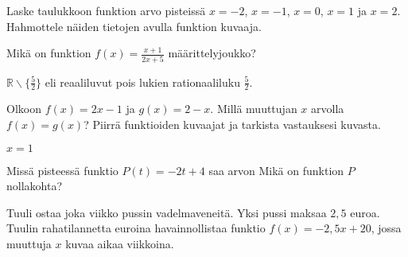 \begin{tehtavasivu}
\begin{tehtava}
  Laske taulukkoon funktion arvo pisteissä $x=-2$, $x=-1$, $x=0$, $x=1$ ja $x=2$. Hahmottele näiden tietojen avulla funktion kuvaaja.

  \begin{vastaus}
  \end{vastaus}
\end{tehtava}

\begin{tehtava} %
  Mikä on funktion $f(x)=\frac{x+1}{2x+5}$ määrittelyjoukko?

  \begin{vastaus}
   $\mathbb{R} \backslash \lbrace \frac{5}{2} \rbrace$ eli reaaliluvut pois lukien rationaaliluku $\frac{5}{2}$.
  \end{vastaus}

\end{tehtava}

\begin{tehtava} %
	Olkoon $f(x) = 2x-1$ ja $g(x) = 2-x$. Millä muuttujan $x$ arvolla $f(x) = g(x)$? Piirrä funktioiden kuvaajat ja tarkista vastauksesi kuvasta.
    \begin{vastaus}
    $x=1$
    \end{vastaus}
\end{tehtava}

\begin{tehtava} %
	Missä pisteessä funktio $P(t)=-2t+4$ saa arvon
	 Mikä on funktion $P$ nollakohta?
	 \begin{vastaus}
	 \end{vastaus}
\end{tehtava}

\begin{tehtava} %
	Tuuli ostaa joka viikko pussin vadelmaveneitä. Yksi pussi maksaa $2,5$ euroa. Tuulin rahatilannetta euroina havainnollistaa funktio $f(x) = -2,5x+20$, jossa muuttuja $x$ kuvaa aikaa viikkoina.
	 

\end{tehtava}
\end{tehtavasivu}
